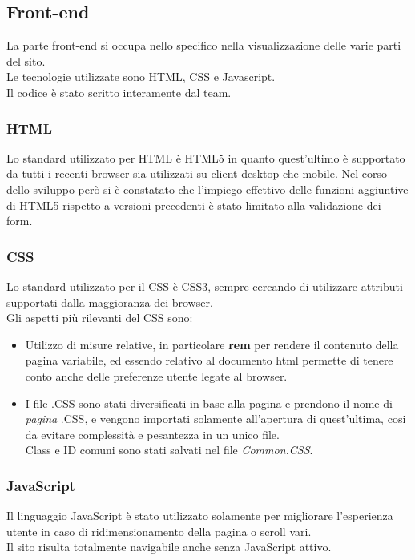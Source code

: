 \subsection{Front-end}

La parte front-end si occupa nello specifico nella visualizzazione delle varie parti del sito.\\
Le tecnologie utilizzate sono HTML, CSS e Javascript.\\
Il codice è stato scritto interamente dal team.

\subsubsection{HTML}

Lo standard utilizzato per HTML è HTML5 in quanto quest’ultimo è supportato da tutti i recenti browser sia utilizzati su client desktop che mobile. 
Nel corso dello sviluppo però si è constatato che l’impiego effettivo delle funzioni aggiuntive di HTML5 rispetto a versioni precedenti è stato limitato alla validazione dei form.

\subsubsection{CSS}
Lo standard utilizzato per il CSS è CSS3, sempre cercando di utilizzare attributi supportati dalla maggioranza dei browser.\\
Gli aspetti più rilevanti del CSS sono:
\begin{itemize}
	\item Utilizzo di misure relative, in particolare \textbf{rem} per rendere il contenuto della pagina variabile, ed essendo relativo al documento html permette di tenere conto anche delle preferenze utente legate al browser.
	\item I file .CSS sono stati diversificati in base alla pagina e prendono il nome di \textit{pagina} .CSS, e vengono importati solamente all'apertura di quest'ultima, cosi da evitare complessità e pesantezza in un unico file.\\Class e ID comuni sono stati salvati nel file \textit{Common.CSS}.
\end{itemize}

\subsubsection{JavaScript}
Il linguaggio JavaScript è stato utilizzato solamente per migliorare l'esperienza utente in caso di ridimensionamento della pagina o scroll vari.\\ Il sito risulta totalmente navigabile anche senza JavaScript attivo.
\newpage
